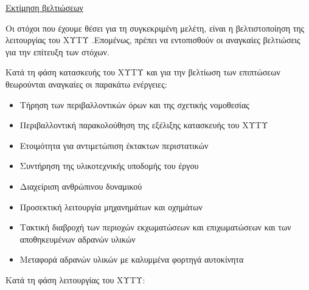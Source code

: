 \documentclass[12pt]{article}
\begin{document}
 	\underline{Εκτίμηση βελτιώσεων}
 	
 	Οι στόχοι που έχουμε θέσει για τη συγκεκριμένη μελέτη, είναι η βελτιστοποίηση της λειτουργίας του ΧΥΤΥ .Επομένως, πρέπει να εντοπισθούν οι αναγκαίες βελτιώσεις για την επίτευξη των στόχων.
 	
 	Κατά τη φάση κατασκευής του ΧΥΤΥ και για την βελτίωση των επιπτώσεων θεωρούνται αναγκαίες οι παρακάτω ενέργειες:
 	
 	\begin{itemize}
 		\item Τήρηση των περιβαλλοντικών όρων και της σχετικής νομοθεσίας
 		\item Περιβαλλοντική παρακολούθηση της εξέλιξης κατασκευής του ΧΥΤΥ
 		\item Ετοιμότητα για αντιμετώπιση έκτακτων περιστατικών 
 		\item Συντήρηση της υλικοτεχνικής υποδομής του έργου 
 		\item Διαχείριση ανθρώπινου δυναμικού 
 		\item Προσεκτική λειτουργία μηχανημάτων και οχημάτων 
 		\item Τακτική διαβροχή των περιοχών εκχωματώσεων και επιχωματώσεων και των αποθηκευμένων αδρανών υλικών 
 		\item Μεταφορά αδρανών υλικών με καλυμμένα φορτηγά αυτοκίνητα
 	\end{itemize}
 
 	Κατά τη φάση λειτουργίας του ΧΥΤΥ:
 	
\end{document}
